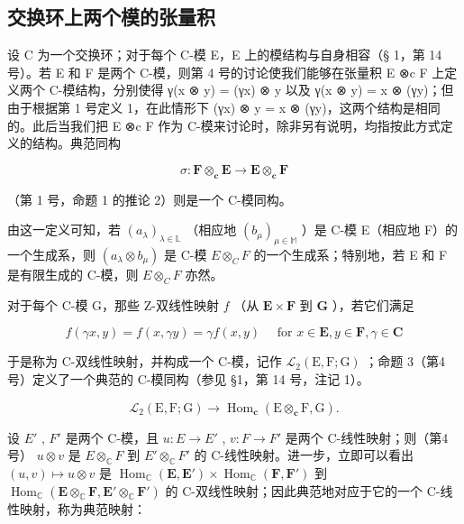 \subsection{交换环上两个模的张量积}

设 C 为一个交换环；对于每个 C-模 E，E 上的模结构与自身相容（§ 1，第 14 号）。若 E 和 F 是两个 C-模，则第 4 号的讨论使我们能够在张量积 E ⊗c F 上定义两个 C-模结构，分别使得 γ(x ⊗ y) = (γx) ⊗ y 以及 γ(x ⊗ y) = x ⊗ (γy)；但由于根据第 1 号定义 1，在此情形下 (γx) ⊗ y = x ⊗ (γy)，这两个结构是相同的。此后当我们把 E ⊗c F 作为 C-模来讨论时，除非另有说明，均指按此方式定义的结构。典范同构

\[
\sigma : \mathbf {F} \otimes_ {\mathbf {c}} \mathbf {E} \rightarrow \mathbf {E} \otimes_ {\mathbf {c}} \mathbf {F}
\]

（第 1 号，命题 1 的推论 2）则是一个 C-模同构。

由这一定义可知，若 \((a_{\lambda})_{\lambda\in\mathbb{L}}\) （相应地 \((b_{\mu})_{\mu\in\mathbb{M}}\) ）是 C-模 E（相应地 F）的一个生成系，则 \((a_{\lambda}\otimes b_{\mu})\) 是 C-模 \(E\otimes_{C}F\) 的一个生成系；特别地，若 E 和 F 是有限生成的 C-模，则 \(E\otimes_{C}F\) 亦然。

对于每个 C-模 G，那些 Z-双线性映射 \(f\) （从 \(\mathbf{E} \times \mathbf{F}\) 到 \(\mathbf{G}\) ），若它们满足

\[
f (\gamma x, y) = f (x, \gamma y) = \gamma f (x, y) \quad \text { for } x \in \mathbf {E}, y \in \mathbf {F}, \gamma \in \mathbf {C}\tag{9}
\]

于是称为 C-双线性映射，并构成一个 C-模，记作 \(\mathcal{L}_2(\mathrm{E},\mathrm{F};\mathrm{G})\) ；命题 3（第4号）定义了一个典范的 C-模同构（参见 §1，第 14 号，注记 1）。

\[
\mathcal {L} _ {2} (\mathrm{E}, \mathrm{F}; \mathrm{G}) \rightarrow \operatorname{Hom} _ {\mathbf {c}} (\mathrm{E} \otimes_ {\mathbf {c}} \mathrm{F}, \mathrm{G}).\tag{10}
\]

设 \(E'\) , \(F'\) 是两个 C-模，且 \(u: E \to E'\) , \(v: F \to F'\) 是两个 C-线性映射；则（第4号） \(u \otimes v\) 是 \(E \otimes_{\mathbb{C}} F\) 到 \(E' \otimes_{\mathbb{C}} F'\) 的 C-线性映射。进一步，立即可以看出 \((u, v) \mapsto u \otimes v\) 是 \(\operatorname{Hom}_{\mathbb{C}}(\mathbf{E}, \mathbf{E}') \times \operatorname{Hom}_{\mathbb{C}}(\mathbf{F}, \mathbf{F}')\) 到 \(\operatorname{Hom}_{\mathbb{C}}(\mathbf{E} \otimes_{\mathbb{C}} \mathbf{F}, \mathbf{E}' \otimes_{\mathbb{C}} \mathbf{F}')\) 的 C-双线性映射；因此典范地对应于它的一个 C-线性映射，称为典范映射：

